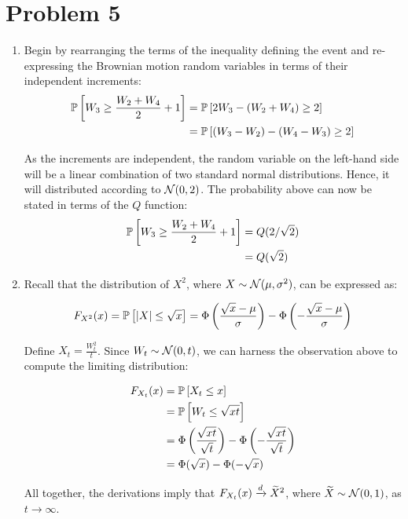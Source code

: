 \documentclass[12pt]{article}%
\begin{document}
\section{Problem 5}
\begin{enumerate}
  \item Begin by rearranging the terms of the inequality defining the event and re-expressing the Brownian motion random variables in terms of their independent increments:
  \begin{align*}
\mathbb{P}\left[W_3 \geq \frac{W_2 + W_4}{2} + 1\right] & = \mathbb{P}\left[2W_3 - (W_2 + W_4) \geq 2\right] \\
& = \mathbb{P}\left[(W_3 - W_2) - (W_4 - W_3) \geq 2\right]
  \end{align*}

  As the increments are independent, the random variable on the left-hand side will be a linear combination of two standard normal distributions. Hence, it will distributed according to $\mathcal{N}(0,2)$. The probability above can now be stated in terms of the $Q$ function:
  \begin{align*}
    \mathbb{P}\left[W_3 \geq \frac{W_2 + W_4}{2} + 1\right] & = Q(2/\sqrt{2}) \\
    & = Q(\sqrt{2})
  \end{align*}

  \item Recall that the distribution of $X^2$, where $X \sim \mathcal{N}(\mu,\sigma^2)$, can be expressed as:

  \[F_{X^2}(x) = \mathbb{P}\left[\abs{X} \leq \sqrt{x}\right] = \Phi\left(\frac{\sqrt{x} - \mu}{\sigma}\right) - \Phi\left(-\frac{\sqrt{x} - \mu}{\sigma}\right) \]

  Define $X_t = \frac{W_t^2}{t}$. Since $W_t \sim \mathcal{N}(0,t)$, we can harness the observation above to compute the limiting distribution:

  \begin{align*}
    F_{X_t}(x) & = \mathbb{P}\left[X_t \leq x\right] \\
      & = \mathbb{P}\left[W_t \leq \sqrt{xt}\right] \\
      & = \Phi\left(\frac{\sqrt{xt}}{\sqrt{t}}\right) - \Phi\left(-\frac{\sqrt{xt}}{\sqrt{t}}\right)  \\
      & = \Phi(\sqrt{x}) - \Phi(-\sqrt{x}) \\
  \end{align*}

  All together, the derivations imply that $F_{X_t}(x) \xrightarrow[]{d} \widetilde{X}^2$, where $\widetilde{X} \sim \mathcal{N}(0,1)$, as $t \rightarrow \infty$.

\end{enumerate}
\end{document}

